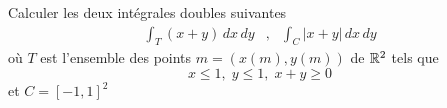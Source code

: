 Calculer les deux intégrales doubles suivantes
\begin{eqnarray*}
 \int_T (x+y)\,dx\,dy &,&  \int_C \vert x+y \vert \,dx\,dy
\end{eqnarray*}
où 
$T$ est l'ensemble des points $m=(x(m), y(m))$ de $\mathbb{R}^2$ tels que
\begin{displaymath}
 x\leq 1 ,\; y \leq 1, \;x+y\geq 0
\end{displaymath}
et $C=[-1,1]^2$ 